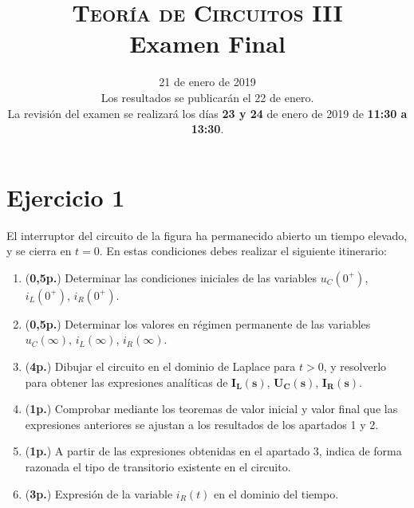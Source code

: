 \documentclass[12pt]{article}
\newcommand{\laplace}[1]{\mathbf{#1}(\mathbf{s})}
\begin{document}
\title{\textsc{Teoría de Circuitos III}\\Examen Final}

\date{21 de enero de  2019\\\small{Los resultados se publicarán el 22 de enero.\\La revisión del examen se realizará los días \textbf{23 y 24} de enero de 2019 de \textbf{11:30 a 13:30}.}}

\maketitle

\section*{Ejercicio 1}

El interruptor del circuito de la figura ha permanecido abierto un tiempo elevado, y se cierra en $t = 0$. En estas condiciones debes realizar el siguiente itinerario:

\begin{enumerate}
\item (\textbf{0,5p.}) Determinar las condiciones iniciales de las variables $u_C(0^+)$, $i_L(0^+)$, $i_R(0^+)$.
\item (\textbf{0,5p.}) Determinar los valores en régimen permanente de las variables $u_C(\infty)$, $i_L(\infty)$, $i_R(\infty)$.
\item (\textbf{4p.}) Dibujar el circuito en el dominio de Laplace para $t > 0$, y resolverlo para obtener las expresiones analíticas de $\laplace{I_L}$, $\laplace{U_C}$, $\laplace{I_R}$.
\item (\textbf{1p.}) Comprobar mediante los teoremas de valor inicial y valor final que las expresiones anteriores se ajustan a los resultados de los apartados 1 y 2.

\item (\textbf{1p.}) A partir de las expresiones obtenidas en el apartado 3, indica de forma razonada el tipo de transitorio existente en el circuito.

\item (\textbf{3p.}) Expresión de la variable $i_R(t)$ en el dominio del tiempo.
\end{enumerate}
\end{document}
